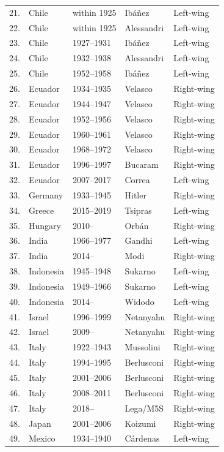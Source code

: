 {\begin{longtable}{rp{2.2cm}p{2.4cm}p{3.2cm}l}
21. & Chile & within 1925 & Ib\'a\~nez & Left-wing \\
22. & Chile & within 1925 & Alessandri & Left-wing \\
23. & Chile & 1927--1931 & Ib\'a\~nez & Left-wing \\
24. & Chile & 1932--1938 & Alessandri & Left-wing \\
25. & Chile & 1952--1958 & Ib\'a\~nez & Left-wing \\
26. & Ecuador & 1934--1935 & Velasco & Right-wing \\
27. & Ecuador & 1944--1947 & Velasco & Right-wing \\
28. & Ecuador & 1952--1956 & Velasco & Right-wing \\
29. & Ecuador & 1960--1961 & Velasco & Right-wing \\
30. & Ecuador & 1968--1972 & Velasco & Right-wing \\
31. & Ecuador & 1996--1997 & Bucaram & Right-wing \\
32. & Ecuador & 2007--2017 & Correa & Left-wing \\
33. & Germany & 1933--1945 & Hitler & Right-wing \\
34. & Greece & 2015--2019 & Tsipras & Left-wing \\
35. & Hungary & 2010-- & Orb\'an & Right-wing \\
36. & India & 1966--1977 & Gandhi & Left-wing \\
37. & India & 2014-- & Modi & Right-wing \\
38. & Indonesia & 1945--1948 & Sukarno & Left-wing \\
39. & Indonesia & 1949--1966 & Sukarno & Left-wing \\
40. & Indonesia & 2014-- & Widodo & Left-wing \\
41. & Israel & 1996--1999 & Netanyahu & Right-wing \\
42. & Israel & 2009-- & Netanyahu & Right-wing \\
43. & Italy & 1922--1943 & Mussolini & Right-wing \\
44. & Italy & 1994--1995 & Berlusconi & Right-wing \\
45. & Italy & 2001--2006 & Berlusconi & Right-wing \\
46. & Italy & 2008--2011 & Berlusconi & Right-wing \\
47. & Italy & 2018-- & Lega/M5S & Right-wing \\
48. & Japan & 2001--2006 & Koizumi & Right-wing \\
49. & Mexico & 1934--1940 & C\'ardenas & Left-wing \\

\end{longtable}}

